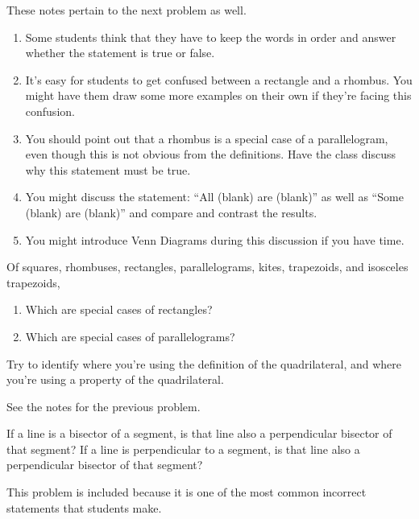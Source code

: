 \documentclass[handout]{ximera}
\begin{document}
\begin{problem}
\begin{instructorNotes}
These notes pertain to the next problem as well.
\begin{enumerate}
\item Some students think that they have to keep the words in order and answer whether the statement is true or false.  
\item It's easy for students to get confused between a rectangle and a rhombus.  You might have them draw some more examples on their own if they're facing this confusion.
\item You should point out that a rhombus is a special case of a parallelogram, even though this is not obvious from the definitions.  Have the class discuss why this statement must be true.
\item You might discuss the statement: ``All (blank) are (blank)'' as well as ``Some (blank) are (blank)'' and compare and contrast the results.
\item You might introduce Venn Diagrams during this discussion if you have time.
\end{enumerate}
\end{instructorNotes}
\end{problem}

\newpage
\begin{problem}  
Of squares, rhombuses, rectangles, parallelograms, kites, trapezoids, and isosceles trapezoids, 
\begin{enumerate}
    \item   Which are special cases of rectangles?
    \item Which are special cases of parallelograms? 
\end{enumerate}

Try to identify where you're using the definition of the quadrilateral, and where you're using a property of the quadrilateral.


\begin{instructorNotes}
    See the notes for the previous problem.
\end{instructorNotes}
\end{problem}




\begin{problem} If a line is a bisector of a segment, is that line also a perpendicular bisector of that segment?  If a line is perpendicular to a segment, is that line also a perpendicular bisector of that segment? 




\begin{instructorNotes}
    This problem is included because it is one of the most common incorrect statements that students make.
\end{instructorNotes}
\end{problem}
\end{document}
